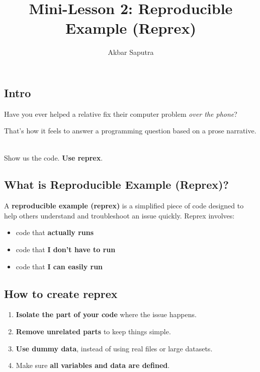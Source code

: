 \documentclass[
  letterpaper,
  DIV=11,
  numbers=noendperiod]{scrartcl}
\title{Mini-Lesson 2: Reproducible Example (Reprex)}
\author{Akbar Saputra}
\date{}
\providecommand{\tightlist}{%
  \setlength{\itemsep}{0pt}\setlength{\parskip}{0pt}}\usepackage{longtable,booktabs,array}
\begin{document}
\maketitle


\subsection{Intro}\label{intro}

Have you ever helped a relative fix their computer problem \emph{over
the phone}?

That's how it feels to answer a programming question based on a prose
narrative.\\
\strut \\
Show us the code. \textbf{Use reprex}.

\subsection{What is Reproducible Example
(Reprex)?}\label{what-is-reproducible-example-reprex}

A \textbf{reproducible example (reprex)} is a simplified piece of code
designed to help others understand and troubleshoot an issue quickly.
Reprex involves:

\begin{itemize}
\tightlist
\item
  code that \textbf{actually runs}
\item
  code that \textbf{I don't have to run}
\item
  code that \textbf{I can easily run}
\end{itemize}

\subsection{How to create reprex}\label{how-to-create-reprex}

\begin{enumerate}
\def\labelenumi{\arabic{enumi}.}
\tightlist
\item
  \textbf{Isolate the part of your code} where the issue happens.
\item
  \textbf{Remove unrelated parts} to keep things simple.
\item
  \textbf{Use dummy data}, instead of using real files or large
  datasets.
\item
  Make sure \textbf{all variables and data are defined}.
\end{enumerate}
\end{document}
